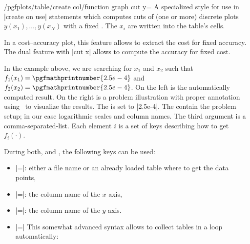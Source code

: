 \begin{stylekey}{/pgfplots/table/create col/function graph cut y=}
	A specialized style for use in |create on use| statements which computes cuts of (one or more) discrete plots $y(x_1), \dotsc, y(x_N)$ with a fixed . The $x_i$ are written into the table's cells.

	In a cost--accuracy plot, this feature allows to extract the cost for fixed accuracy. The dual feature with |cut x| allows to compute the accuracy for fixed cost.
	
	\pgfplotsset{anchor=center,/tikz/baseline}
\begin{codeexample}[]
	\loadedtable

\pgfplotstabletypeset{\loadedtable}

\end{codeexample}
	In the example above, we are searching for $x_1$ and $x_2$ such that $f_1(x_1) = \pgfmathprintnumber{2.5e-4}$ and $f_2(x_2) =\pgfmathprintnumber{2.5e-4}$. On the left is the automatically computed result. On the right is a problem illustration with proper annotation using \PGFPlots\ to visualize the results.
	The  is set to |2.5e-4|. The  contain the problem setup; in our case logarithmic scales and column names. The third argument is a comma-separated-list. Each element $i$ is a set of keys describing how to get $f_i(\cdot)$.

	During both,  and , the following keys can be used:
	\begin{itemize}
		\item {}|=|: either a file name or an already loaded table where to get the data points,
		\item {}|=|: the column name of the $x$ axis,
		\item {}|=|: the column name of the $y$ axis.
		\item {}|=|
			This somewhat advanced syntax allows to collect tables in a loop automatically:


\end{itemize}
\end{stylekey}

